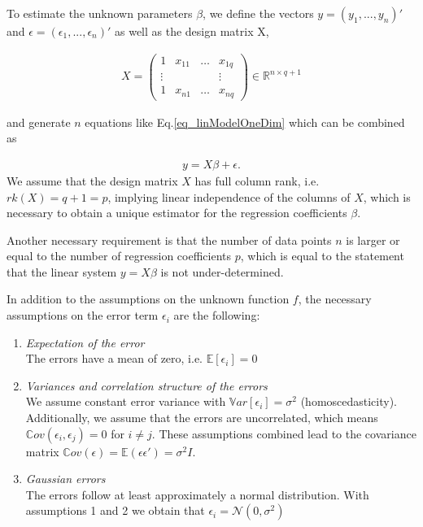 \documentclass[10pt,a4paper]{article}
\begin{document}
To estimate the unknown parameters $\beta$, we define the vectors $y = (y_1, ..., y_n)'$ and $\epsilon = (\epsilon_1, ..., \epsilon_n)'$ as well as the design matrix X, 

\begin{align}
	X = \begin{pmatrix}   1     & x_{11} & \dots & x_{1q} \\ 
					 	 \vdots &        &       & \vdots \\ 
				  		  1     & x_{n1} & \dots & x_{nq}  
		\end{pmatrix} \in \mathbb{R}^{n \times q+1}		
\end{align}

and generate $n$ equations like Eq.\ref{eq_linModelOneDim} which can be combined as 

\begin{align}
	y = X\beta + \epsilon.
\end{align}
We assume that the design matrix $X$ has full column rank, i.e. $rk(X) = q + 1 = p$, implying linear independence of the columns of $X$, which is necessary to obtain a unique estimator for the regression coefficients $\beta$. \cite{fahrmeir2013regression}

Another necessary requirement is that the number of data points $n$ is larger or equal to the number of regression coefficients $p$, which is equal to the statement that the linear system $y = X\beta$ is not under-determined.

In addition to the assumptions on the unknown function $f$, the necessary assumptions on the error term $\epsilon_i$ are the following:

\begin{enumerate}
	\item \emph{Expectation of the error} \\
	The errors have a mean of zero, i.e. $\mathbb E[\epsilon_i] = 0$

	\item \emph{Variances and correlation structure of the errors} \\
	We assume constant error variance with $\mathbb Var[\epsilon_i] = \sigma^2$ (homoscedasticity). Additionally, we assume that the errors are uncorrelated, which means $\mathbb Cov(\epsilon_i, \epsilon_j) = 0$ for $i \ne j$. These assumptions combined lead to the covariance matrix $\mathbb Cov(\epsilon) = \mathbb E(\epsilon \epsilon') 	= \sigma^2 I$.

	\item \emph{Gaussian errors} \\
	The errors follow at least approximately a normal distribution. With assumptions 1 and 2 we obtain that $\epsilon_i = \mathcal N(0, \sigma^2)$ 
\end{enumerate}
\end{document}
